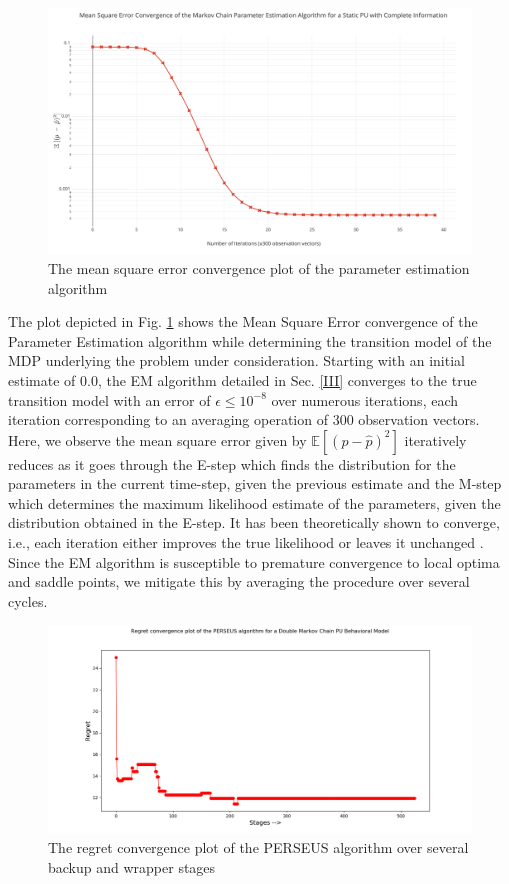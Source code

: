 \documentclass[10pt,twocolumn]{IEEEtran}
\begin{document}
\begin{figure}
    \centering
    \includegraphics[scale=0.215]{ParameterEstimatorConvergence.png}
    \caption{The mean square error convergence plot of the parameter estimation algorithm}
    \label{fig:4}
\end{figure}
The plot depicted in Fig. \ref{fig:4} shows the Mean Square Error convergence of the Parameter Estimation algorithm while determining the transition model of the MDP underlying the problem under consideration. Starting with an initial estimate of 0.0, the EM algorithm detailed in Sec. \ref{III} converges to the true transition model  with an error of $\epsilon \leq 10^{-8}$ over numerous iterations, each iteration corresponding to an averaging operation of 300 observation vectors. Here, we observe the mean square error given by $\mathbb{E}[(p - \hat{p})^{2}]$ iteratively reduces as it goes through the E-step which finds the distribution for the parameters in the current time-step, given the previous estimate and the M-step which determines the maximum likelihood estimate of the parameters, given the distribution obtained in the E-step. It has been theoretically shown to converge, i.e., each iteration either improves the true likelihood or leaves it unchanged \cite{Neal1998}. Since the EM algorithm is susceptible to premature convergence to local optima and saddle points, we mitigate this by averaging the procedure over several cycles.
\begin{figure}
    \centering
    \includegraphics[scale=0.25]{Regret_Convergence_Plot_04112019.png}
    \caption{The regret convergence plot of the PERSEUS algorithm over several backup and wrapper stages}
    \label{fig:5}
\end{figure}
\end{document}
